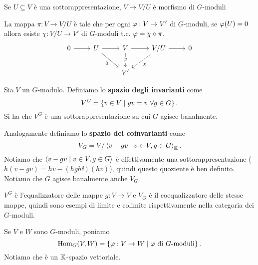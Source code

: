 \begin{example}
    Se $U\subseteq V$ \`e una sottorappresentazione, $V\to V/U$ \`e morfismo di $G$-moduli
\end{example}

\begin{remark}
La mappa $\pi:V\to V/U$ \`e tale che per ogni $\varphi:V\to V'$ di $G$-moduli, se $\varphi(U)=0$ allora esiste $\chi:V/U\to V'$ di $G$-moduli t.c. $\varphi=\chi\circ \pi$.
\[\begin{tikzcd}
	0 & U & V & {V/U} & 0 \\
	&& {V'}
	\arrow[from=1-1, to=1-2]
	\arrow[from=1-2, to=1-3]
	\arrow["0"', from=1-2, to=2-3]
	\arrow[from=1-3, to=1-4]
	\arrow["\vp"{description}, from=1-3, to=2-3]
	\arrow[from=1-4, to=1-5]
	\arrow["\chi", dashed, from=1-4, to=2-3]
\end{tikzcd}\]
\end{remark}


\begin{definition}
Sia $V$ un $G$-modulo. Definiamo lo \textbf{spazio degli invarianti} come
\[V^G=\left\{{v\in V\mid gv=v\ \forall g\in G}\right\}.\] Si ha che $V^G$ \`e una sottorappresentazione su cui $G$ agisce banalmente.

Analogamente definiamo lo \textbf{spazio dei coinvarianti} come
\[V_G=V/\left\langle {v-gv\mid v\in V,g\in G}\right\rangle_{\mathbb{K}}.\]
Notiamo che $\left\langle {v-gv\mid v\in V,g\in G}\right\rangle$ \`e effettivamente una sottorappresentazione ($h(v-gv)=hv-(hgh\ii)(hv)$), quindi questo quoziente \`e ben definito. Notiamo che $G$ agisce banalmente anche $V_G$.
\end{definition}

\begin{remark}
$V^G$ \`e l'equalizzatore delle mappe $g:V\to V$ e $V_G$ \`e il coequalizzatore delle stesse mappe, quindi sono esempi di limite e colimite rispettivamente nella categoria dei $G$-moduli.
\end{remark}


\begin{notation}
Se $V$ e $W$ sono $G$-moduli, poniamo
\[\operatorname{Hom}_G(V,W)=\left\{{\varphi:V\to W\mid \text{$\varphi$ di $G$-moduli}}\right\}.\]
Notiamo che \`e un $\mathbb{K}$-spazio vettoriale.
\end{notation}

